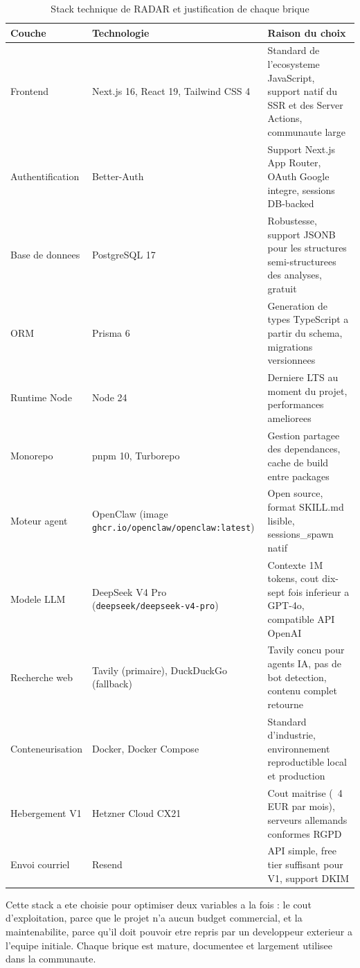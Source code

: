 \documentclass[12pt,a4paper,openany]{report}
\begin{document}
\begin{table}[H]
  \centering
  \caption{Stack technique de RADAR et justification de chaque brique}
  \label{tab:stack}
  \small
  \begin{tabularx}{\linewidth}{lYY}
    \toprule
    \textbf{Couche} & \textbf{Technologie} & \textbf{Raison du choix} \\
    \midrule
    Frontend & Next.js 16, React 19, Tailwind CSS 4 & Standard de l'ecosysteme JavaScript, support natif du SSR et des Server Actions, communaute large \\
    Authentification & Better-Auth & Support Next.js App Router, OAuth Google integre, sessions DB-backed \\
    Base de donnees & PostgreSQL 17 & Robustesse, support JSONB pour les structures semi-structurees des analyses, gratuit \\
    ORM & Prisma 6 & Generation de types TypeScript a partir du schema, migrations versionnees \\
    Runtime Node & Node 24 & Derniere LTS au moment du projet, performances ameliorees \\
    Monorepo & pnpm 10, Turborepo & Gestion partagee des dependances, cache de build entre packages \\
    Moteur agent & OpenClaw (image \texttt{ghcr.io/openclaw/openclaw:latest}) & Open source, format SKILL.md lisible, sessions\_spawn natif \\
    Modele LLM & DeepSeek V4 Pro (\texttt{deepseek/deepseek-v4-pro}) & Contexte 1M tokens, cout dix-sept fois inferieur a GPT-4o, compatible API OpenAI \\
    Recherche web & Tavily (primaire), DuckDuckGo (fallback) & Tavily concu pour agents IA, pas de bot detection, contenu complet retourne \\
    Conteneurisation & Docker, Docker Compose & Standard d'industrie, environnement reproductible local et production \\
    Hebergement V1 & Hetzner Cloud CX21 & Cout maitrise (~4 EUR par mois), serveurs allemands conformes RGPD \\
    Envoi courriel & Resend & API simple, free tier suffisant pour V1, support DKIM \\
    \bottomrule
  \end{tabularx}
\end{table}

Cette stack a ete choisie pour optimiser deux variables a la fois : le cout d'exploitation, parce que le projet n'a aucun budget commercial, et la maintenabilite, parce qu'il doit pouvoir etre repris par un developpeur exterieur a l'equipe initiale. Chaque brique est mature, documentee et largement utilisee dans la communaute.
\end{document}
